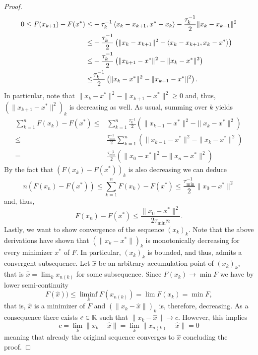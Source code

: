 \begin{proof}
    \begin{equation}
        \begin{aligned}
            0\leq F(x_{k+1})-F(x^*)
            \leq& - \tau_k^{-1} \left\langle x_k-x_{k+1} , x^* - x_k\right\rangle -\frac{\tau_k^{-1}}{2}\|x_k-x_{k+1}\|^2\\
            \leq& -\frac{\tau_k^{-1}}{2} \left( \|x_k-x_{k+1}\|^2 - \left\langle x_k-x_{k+1} , x_k-x^*\right\rangle\right)\\
            \leq& -\frac{\tau_k^{-1}}{2} \left( \|x_{k+1} - x^*\|^2 - \|x_k-x^*\|^2\right)\\
            \leq& \frac{\tau_k^{-1}}{2} \left( \|x_k-x^*\|^2 - \|x_{k+1} - x^*\|^2\right).
        \end{aligned}
    \end{equation}
    In particular, note that $ \|x_k-x^*\|^2 - \|x_{k+1} - x^*\|^2\geq0$ and, thus, $(\|x_{k+1} - x^*\|^2)_k$ is decreasing as well.
    As usual, summing over $k$ yields
    \begin{equation}
        \begin{aligned}
            \sum_{k=1}^n F(x_{k})-F(x^*)
            \leq& \sum_{k=1}^n\frac{\tau_k^{-1}}{2} \left( \|x_{k-1}-x^*\|^2 - \|x_{k} - x^*\|^2\right)\\
            \leq& \frac{\tau_{\min}^{-1}}{2}\sum_{k=1}^n \left( \|x_{k-1}-x^*\|^2 - \|x_{k} - x^*\|^2\right)\\
            =& \frac{\tau_{\min}^{-1}}{2} \left( \|x_{0}-x^*\|^2 - \|x_{n} - x^*\|^2\right)
        \end{aligned}
    \end{equation}
    By the fact that $(F(x_{k})-F(x^*))_k$ is also decreasing we can deduce
    \begin{equation}
        n(F(x_{n})-F(x^*))\leq \sum_{k=1}^n F(x_{k})-F(x^*)
        \leq \frac{\tau_{\min}^{-1}}{2} \|x_{0}-x^*\|^2
    \end{equation}
    and, thus, 
    \begin{equation}
        F(x_{n})-F(x^*)\leq \frac{\|x_{0}-x^*\|^2}{2\tau_{\min} n}.
    \end{equation}
    Lastly, we want to show convergence of the sequence $(x_k)_k$. Note that the above derivations have shown that $(\|x_k-x^*\|)_k$ is monotonically decreasing for every minimizer $x^*$ of $F$. In particular, $(x_k)_k$ is bounded, and thus, admits a convergent subsequence. 
    Let $\hat x$ be an arbitrary accumulation point of $(x_k)_k$, that is $\hat x=\lim_k x_{n(k)}$ for some subsequence. Since $F(x_k)\rightarrow \min F$ we have by lower semi-continuity
    \[
        F(\hat x))\leq \liminf_k F(x_{n(k)}) = \lim F(x_k) = \min F,
    \]
    that is, $\hat x$ is a minimizer of $F$ and $(\|x_k-\hat{x}\|)_k$ is, therefore, decreasing. As a consequence there exists $c\in\mathbb{R}$ such that $\|x_k-\hat{x}\|\rightarrow c$. However, this implies
    \begin{equation}
        c = \lim_k \|x_k-\hat{x}\| = \lim_k \|x_{n(k)}-\hat{x}\| = 0
    \end{equation}
    meaning that already the original sequence converges to $\hat{x}$ concluding the proof.
\end{proof}